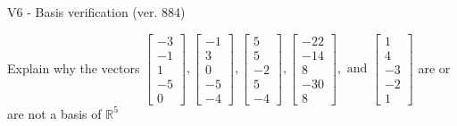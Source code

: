 \begin{exercise}
  \begin{exerciseTitle}V6 - Basis verification (ver. 884)\end{exerciseTitle}
  \begin{exerciseStatement}
    Explain why the vectors \(\left[\begin{array}{r}
-3 \\
-1 \\
1 \\
-5 \\
0
\end{array}\right] , \left[\begin{array}{r}
-1 \\
3 \\
0 \\
-5 \\
-4
\end{array}\right] , \left[\begin{array}{r}
5 \\
5 \\
-2 \\
5 \\
-4
\end{array}\right] , \left[\begin{array}{r}
-22 \\
-14 \\
8 \\
-30 \\
8
\end{array}\right] , \text{ and } \left[\begin{array}{r}
1 \\
4 \\
-3 \\
-2 \\
1
\end{array}\right]\) are or are not a basis of \(\mathbb{R}^5\)	



\end{exerciseStatement}
\end{exercise}
